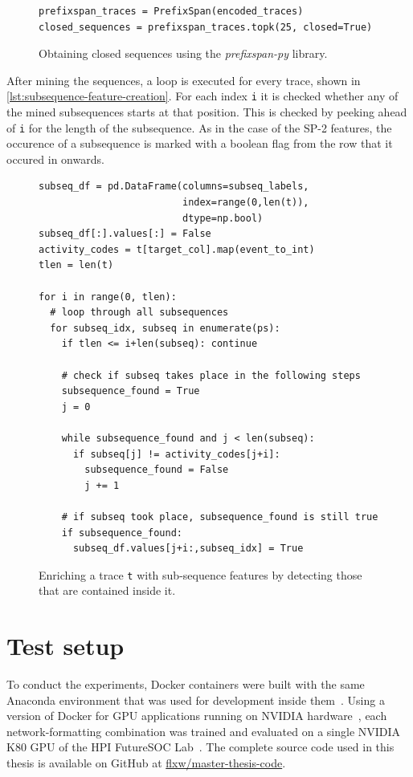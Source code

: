 \begin{figure}
\begin{verbatim}
prefixspan_traces = PrefixSpan(encoded_traces)
closed_sequences = prefixspan_traces.topk(25, closed=True)
\end{verbatim}
\caption{Obtaining closed sequences using the \textit{prefixspan-py} library.}
\label{lst:pfs-mining}
\end{figure}

After mining the sequences, a loop is executed for every trace, shown in \autoref{lst:subsequence-feature-creation}. For each index \verb=i= it is checked whether any of the mined subsequences starts at that position. This is checked by peeking ahead of \verb=i= for the length of the subsequence. As in the case of the SP-2 features, the occurence of a subsequence is marked with a boolean flag from the row that it occured in onwards.

\begin{figure}
\begin{verbatim}
subseq_df = pd.DataFrame(columns=subseq_labels,
                         index=range(0,len(t)),
                         dtype=np.bool)
subseq_df[:].values[:] = False
activity_codes = t[target_col].map(event_to_int)
tlen = len(t)

for i in range(0, tlen):
  # loop through all subsequences
  for subseq_idx, subseq in enumerate(ps):
    if tlen <= i+len(subseq): continue
            
    # check if subseq takes place in the following steps
    subsequence_found = True
    j = 0
    
    while subsequence_found and j < len(subseq):
      if subseq[j] != activity_codes[j+i]:
        subsequence_found = False
        j += 1

    # if subseq took place, subsequence_found is still true
    if subsequence_found:
      subseq_df.values[j+i:,subseq_idx] = True
\end{verbatim}
\caption{Enriching a trace \texttt{t} with sub-sequence features by detecting those that are contained inside it.}
\label{lst:subsequence-feature-creation}
\end{figure}

\section{Test setup}
\label{sec:eval:test-setup}
To conduct the experiments, Docker containers were built with the same Anaconda environment that was used for development inside them~\cite{web:docker}. Using a version of Docker for GPU applications running on NVIDIA hardware~\cite{web:nvidia-docker}, each network-formatting combination was trained and evaluated on a single NVIDIA K80 GPU of the HPI FutureSOC Lab~\cite{web:fsoc}. The complete source code used in this thesis is available on GitHub at \href{https://github.com/flxw/master-thesis-code}{flxw/master-thesis-code}.\\

